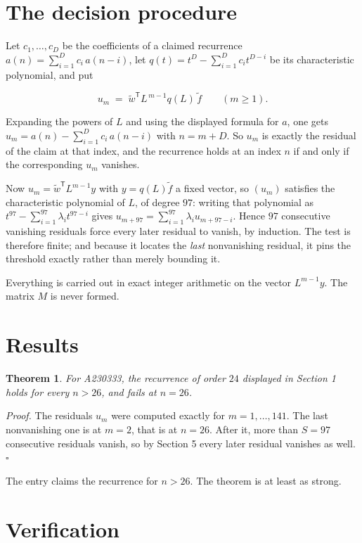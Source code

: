 \documentclass[11pt]{article}
\newtheorem{theorem}{Theorem}
\theoremstyle{definition}
\begin{document}
\section{The decision procedure}

Let $c_1,\dots,c_D$ be the coefficients of a claimed recurrence $a(n) = \sum_{i=1}^{D} c_i\,a(n-i)$, let $q(t) = t^{D} - \sum_{i=1}^{D} c_i t^{D-i}$ be its characteristic polynomial, and put

\[u_m \;=\; \tilde w^{\mathsf T} L^{\,m-1} q(L)\,\tilde f \qquad (m \ge 1).\]

Expanding the powers of $L$ and using the displayed formula for $a$, one gets $u_m = a(n) - \sum_{i=1}^{D} c_i\,a(n-i)$ with $n = m + D$. So $u_m$ is exactly the residual of the claim at that index, and the recurrence holds at an index $n$ if and only if the corresponding $u_m$ vanishes.

Now $u_m = \tilde w^{\mathsf T} L^{m-1} y$ with $y = q(L)\tilde f$ a fixed vector, so $(u_m)$ satisfies the characteristic polynomial of $L$, of degree $97$: writing that polynomial as $t^{97} - \sum_{i=1}^{97} \lambda_i t^{97-i}$ gives $u_{m+97} = \sum_{i=1}^{97} \lambda_i u_{m+97-i}$. Hence $97$ consecutive vanishing residuals force every later residual to vanish, by induction. The test is therefore finite; and because it locates the {\itshape last} nonvanishing residual, it pins the threshold exactly rather than merely bounding it.

Everything is carried out in exact integer arithmetic on the vector $L^{m-1}y$. The matrix $M$ is never formed.

\section{Results}

\begin{theorem} For A230333, the recurrence of order $24$ displayed in Section 1 holds for every $n > 26$, and fails at $n = 26$.\end{theorem}

{\itshape Proof.} The residuals $u_m$ were computed exactly for $m = 1,\dots,141$. The last nonvanishing one is at $m = 2$, that is at $n = 26$. After it, more than $S = 97$ consecutive residuals vanish, so by Section 5 every later residual vanishes as well. $\square$

The entry claims the recurrence for $n > 26$. The theorem is at least as strong.

\section{Verification}
\end{document}
